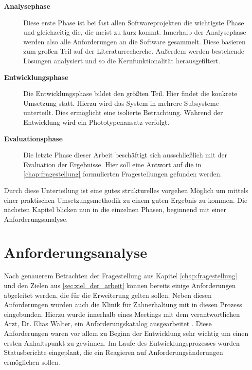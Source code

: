\begin{description}
	\item[\textbf{Analysephase}] Diese erste Phase ist bei fast allen Softwareprojekten
		die wichtigste Phase und gleichzeitig die, die meist zu kurz kommt. Innerhalb
		der Analysephase werden also alle Anforderungen an die Software gesammelt.
		Diese basieren zum großen Teil auf der Literaturrecherche. Außerdem werden bestehende
		Lösungen analysiert und so die Kernfunktionalität herausgefiltert.

	\item[\textbf{Entwicklungsphase}] Die Entwicklungsphase bildet den größten Teil.
		Hier findet die konkrete Umsetzung statt. Hierzu wird das System in mehrere Subsysteme
		unterteilt. Dies ermöglicht eine isolierte Betrachtung. Während der Entwicklung
		wird ein Phototypenansatz verfolgt.

	\item[\textbf{Evaluationsphase}] Die letzte Phase dieser Arbeit beschäftigt sich
		ausschließlich mit der Evaluation der Ergebnisse. Hier soll eine Antwort auf
		die in \ref{chap:fragestellung} formulierten Fragestellungen gefunden werden.
\end{description}

Durch diese Unterteilung ist eine gutes strukturelles vorgehen Möglich um mittels
einer praktischen Umsetzungsmethodik zu einem guten Ergebnis zu kommen. Die
nächsten Kapitel blicken nun in die einzelnen Phasen, beginnend mit einer Anforderungsanalyse.

\section{Anforderungsanalyse}
\label{sec:anforderungsanalyse} Nach genauerem Betrachten der Fragestellung aus Kapitel
\ref{chap:fragestellung} und den Zielen aus \ref{sec:ziel_der_arbeit} können bereits
einige Anforderungen abgeleitet werden, die für die Erweiterung gelten sollen. Neben
diesen Anforderungen wurden auch die Klinik für Zahnerhaltung mit in diesen Prozess
eingebunden. Hierzu wurde innerhalb eines Meetings mit dem verantwortlichen Arzt,
Dr. Elias Walter, ein Anforderungskatalog ausgearbeitet \citep[vgl.][]{walter2025}.
Diese Anforderungen waren vor allem zu Beginn der Entwicklung sehr wichtig um einen
ersten Anhaltspunkt zu gewinnen. Im Laufe des Entwicklungsprozesses wurden
Statusberichte eingeplant, die ein Reagieren auf Anforderungsänderungen ermöglichen
sollen.

